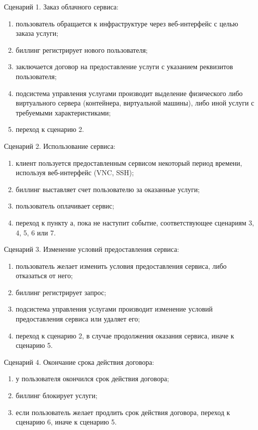 Сценарий 1. Заказ облачного сервиса:
\begin{enumerate}
  \item пользователь обращается к инфраструктуре через веб-интерфейс с целью заказа услуги;
  \item биллинг регистрирует нового пользователя;
  \item заключается договор на предоставление услуги с указанием реквизитов пользователя;
  \item подсистема управления услугами производит выделение физического либо виртуального сервера (контейнера, виртуальной машины), либо иной услуги с требуемыми характеристиками;
  \item переход к сценарию 2.
\end{enumerate}

Сценарий 2. Использование сервиса:
\begin{enumerate}
  \item клиент пользуется предоставленным сервисом некоторый период времени, используя веб-интерфейс (VNC, SSH);
  \item биллинг выставляет счет пользователю за оказанные услуги;
  \item пользователь оплачивает сервис;
  \item переход к пункту а, пока не наступит событие, соответствующее сценариям 3, 4, 5, 6 или 7.
\end{enumerate}

Сценарий 3. Изменение условий предоставления сервиса:
\begin{enumerate}
  \item пользователь желает изменить условия предоставления сервиса, либо отказаться от него;
  \item биллинг регистрирует запрос;
  \item подсистема управления услугами производит изменение условий предоставления сервиса или удаляет его;
  \item переход к сценарию 2, в случае продолжения оказания сервиса, иначе к сценарию 5.
\end{enumerate}

Сценарий 4. Окончание срока действия договора:
\begin{enumerate}
  \item у пользователя окончился срок действия договора;
  \item биллинг блокирует услуги;
  \item если пользователь желает продлить срок действия договора, переход к сценарию 6, иначе к сценарию 5.
\end{enumerate}

